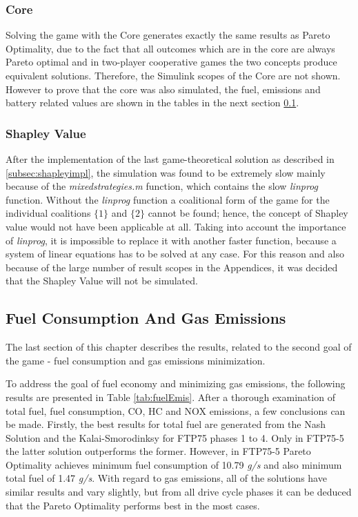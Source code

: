 \subsubsection{Core}
Solving the game with the Core generates exactly the same results as Pareto Optimality, due to the fact that all outcomes which are in the core are always Pareto optimal and in two-player cooperative games the two concepts produce equivalent solutions. Therefore, the Simulink scopes of the Core are not shown. However to prove that the core was also simulated, the fuel, emissions and battery related values are shown in the tables in the next section \ref{sec:goalresults}.

\subsubsection{Shapley Value}
After the implementation of the last game-theoretical solution as described in \ref{subsec:shapleyimpl}, the simulation was found to be extremely slow mainly because of the \textit{mixedstrategies.m} function, which contains the slow \textit{linprog} function. Without the \textit{linprog} function a coalitional form of the game for the individual coalitions $\{1\}$ and $\{2\}$ cannot be found; hence, the concept of Shapley value would not have been applicable at all. Taking into account the importance of \textit{linprog}, it is impossible to replace it with another faster function, because a system of linear equations has to be solved at any case. For this reason and also because of the large number of result scopes in the Appendices, it was decided that the Shapley Value will not be simulated.

\subsection{Fuel Consumption And Gas Emissions}
\label{sec:goalresults}
The last section of this chapter describes the results, related to the second goal of the game - fuel consumption and gas emissions minimization.

To address the goal of fuel economy and minimizing gas emissions, the following results are presented in Table \ref{tab:fuelEmis}. After a thorough examination of total fuel, fuel consumption, CO, HC and NOX emissions, a few conclusions can be made. Firstly, the best results for total fuel are generated from the Nash Solution and the Kalai-Smorodinksy for FTP75 phases 1 to 4. Only in FTP75-5 the latter solution outperforms the former. However, in FTP75-5 Pareto Optimality achieves minimum fuel consumption of 10.79 \textit{g/s} and also minimum total fuel of 1.47 \textit{g/s}. With regard to gas emissions, all of the solutions have similar results and vary slightly, but from all drive cycle phases it can be deduced that the Pareto Optimality performs best in the most cases.

